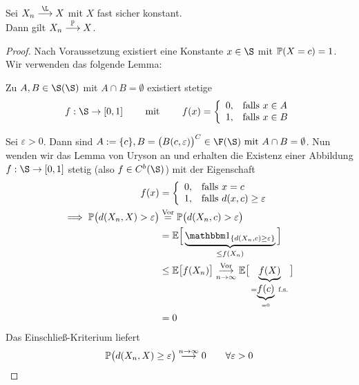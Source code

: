 \begin{satz}\label{satz4.13}
Sei $X_n\stackrel{\L}{\longrightarrow}X$ mit $X$ fast sicher konstant.\\
Dann gilt $X_n\stackrel{\P}{\longrightarrow} X$.
\end{satz}
\begin{proof}
Nach Voraussetzung existiert eine Konstante $x\in\S$ mit $\P(X=c)=1$. Wir verwenden das folgende Lemma:

\begin{lem}\enter\label{lemmaVonUryson}
Zu $A,B\in\S(\S)$ mit $A\cap B=\emptyset$ existiert stetige 
\begin{align*}
f:\S\to[0,1]\qquad\mit\qquad f(x)=\left\lbrace\begin{array}{cl}
0, &\falls x\in A\\
1, &\falls x\in B
\end{array}\right.
\end{align*}
\end{lem}
Sei $\varepsilon>0$. Dann sind $A:=\lbrace c\rbrace, B=\big(B(c,\varepsilon)\big)^C\in\F(\S)\mit A\cap B=\emptyset$. Nun wenden wir das Lemma von Uryson an und erhalten die Existenz einer Abbildung $f:\S\to[0,1]$ stetig (also $f\in C^b(\S)$) mit der Eigenschaft
\begin{align*}
f(x)&=\left\lbrace\begin{array}{cl}
0, &\falls x=c\\
1, &\falls d(x,c)\geq\varepsilon
\end{array}\right.\\
\implies \P\big(d(X_n,X)>\varepsilon\big)
&\stackeq{\text{Vor}}
\P\big(d(X_n,c)>\varepsilon\big)\\
&=\E\Big[\underbrace{\indi_{\lbrace d(X_n,c)\geq\varepsilon\rbrace}}_{\leq f(X_n)}\Big]\\
&\leq\E\big[f(X_n)\big]\stackrelnew{n\to\infty}{\text{Vor}}{\longrightarrow}\E\big[\underbrace{f(X)}_{=\underbrace{f(c)}_{=0}\text{ f.s.}}\big]\\
&=0
\end{align*}
Das Einschließ-Kriterium liefert
\begin{align*}
\P\big(d(X_n,X)\geq\varepsilon\big)\stackrel{n\to\infty}{\longrightarrow}0\qquad\forall\varepsilon>0
\end{align*}
\end{proof}

